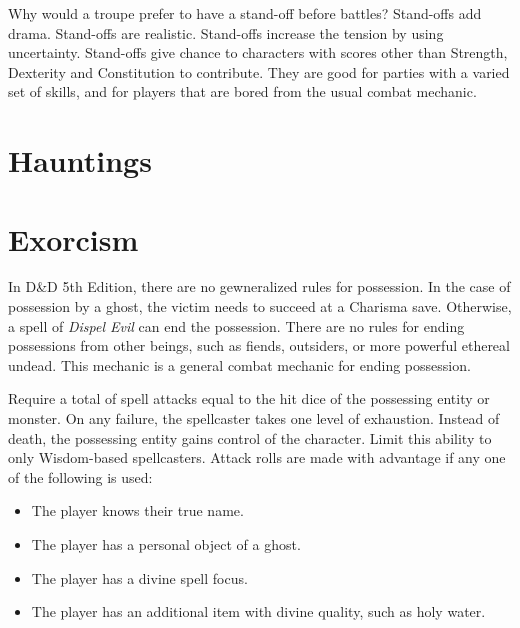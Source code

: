 \documentclass[twocolumn]{dndbook}
\begin{document}
\begin{emphasisParagraph}
	Why would a troupe prefer to have a stand-off before battles?
	Stand-offs add drama. Stand-offs are realistic.
	Stand-offs increase the tension by using uncertainty.
	Stand-offs give chance to characters with scores other than Strength, Dexterity and Constitution to contribute.
	They are good for parties with a varied set of skills, and for players that are bored from the usual combat mechanic.\par
\end{emphasisParagraph}

\section{Hauntings}

\section{Exorcism}

In D\&D 5th Edition, there are no gewneralized rules for possession.
In the case of possession by a ghost, the victim needs to succeed at a Charisma save.
Otherwise, a spell of \emph{Dispel Evil} can end the possession.
There are no rules for ending possessions from other beings, such as fiends, outsiders, or more powerful ethereal undead.
This mechanic is a general combat mechanic for ending possession.\par


Require a total of spell attacks equal to the hit dice of the possessing entity or monster.
On any failure, the spellcaster takes one level of exhaustion. Instead of death, the possessing entity gains control of the character.
Limit this ability to only Wisdom-based spellcasters. %
Attack rolls are made with advantage if any one of the following is used:
\begin{itemize}
	\item The player knows their true name.
	\item The player has a personal object of a ghost.
	\item The player has a divine spell focus.
	\item The player has an additional item with divine quality, such as holy water.
\end{itemize}
\end{document}
